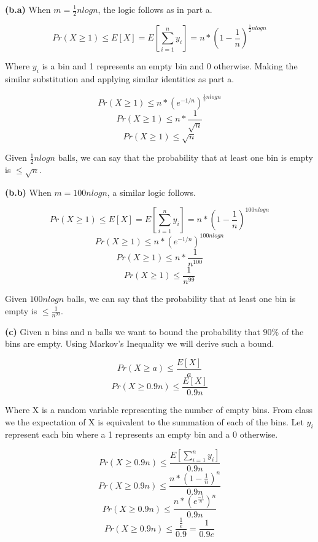 \documentclass[11pt]{article}
\renewcommand\part[1]{\vspace{.10in}\textbf{(#1)}}
\begin{document}
\part{b.a} When $m = \frac{1}{2} n log n$, the logic follows as in part a.

$$Pr(X \geq 1) \leq E[X] = E[\sum_{i = 1}^n y_i] = n * (1 - \frac{1}{n})^{\frac{1}{2} n log n}$$

Where $y_i$ is a bin and 1 represents an empty bin and 0 otherwise. Making the similar substitution and applying similar identities as part a.

$$Pr(X \geq 1) \leq n * (e^{-1/n})^{\frac{1}{2} n log n}$$
$$Pr(X \geq 1) \leq n * \frac{1}{\sqrt{n}}$$
$$Pr(X \geq 1) \leq \sqrt{n}$$

Given $\frac{1}{2} n log n$ balls, we can say that the probability that at least one bin is empty is $\leq \sqrt{n}$.


\part{b.b} When $m = 100 n log n$, a similar logic follows.

$$Pr(X \geq 1) \leq E[X] = E[\sum_{i = 1}^n y_i] = n * (1 - \frac{1}{n})^{100 n log n}$$
$$Pr(X \geq 1) \leq n * (e^{-1/n})^{100 n log n}$$
$$Pr(X \geq 1) \leq n * \frac{1}{n^{100}}$$
$$Pr(X \geq 1) \leq \frac{1}{n^{99}}$$

Given $100 n log n$ balls, we can say that the probability that at least one bin is empty is $\leq \frac{1}{n^{99}}$.


\part{c} Given n bins and n balls we want to bound the probability that $90\%$ of the bins are empty. Using Markov's Inequality we will derive such a bound. 

$$Pr(X \geq a) \leq \frac{E[X]}{a}$$
$$Pr(X \geq 0.9n) \leq \frac{E[X]}{0.9n}$$

Where X is a random variable representing the number of empty bins. From class we the expectation of X is equivalent to the summation of each of the bins. Let $y_i$ represent each bin where a 1 represents an empty bin and a 0 otherwise.

$$Pr(X \geq 0.9n) \leq \frac{E[\sum_{i = 1}^n y_i]}{0.9n}$$
$$Pr(X \geq 0.9n) \leq \frac{n * (1 - \frac{1}{n})^n}{0.9n}$$
$$Pr(X \geq 0.9n) \leq \frac{n * (e^\frac{-1}{n})^n}{0.9n}$$
$$Pr(X \geq 0.9n) \leq \frac{\frac{1}{e}}{0.9} = \frac{1}{0.9e}$$
\end{document}

